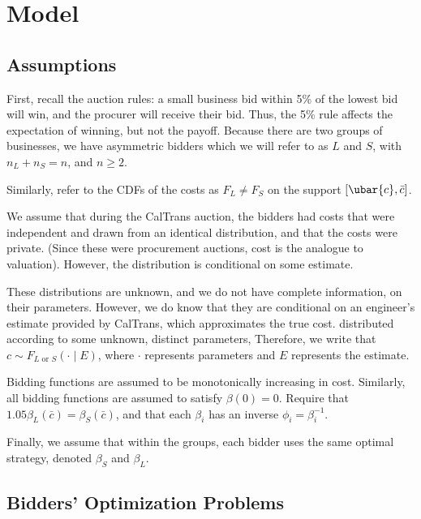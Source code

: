 \section{Model}

\subsection{Assumptions}

First, recall the auction rules: a small business bid
within 5\% of the lowest bid will win, and the procurer will receive their
bid. Thus, the 5\% rule affects the expectation of winning, but not the payoff.
Because there are two groups of businesses, we have asymmetric bidders which
we will refer to as \(L\) and \(S\), with \(n_L + n_S = n\), and \(n \ge 2\).

Similarly, refer to the CDFs of the costs as \(F_{L} \ne F_{S}\)
on the support  \([\ubar{c}, \bar{c}]\).

We assume that during the CalTrans auction, the bidders had costs that
were independent and drawn from an identical distribution, and that the costs
were private. (Since these were procurement auctions, cost is the analogue to
valuation). However, the distribution is conditional on some estimate.

These distributions are unknown, and we do not have complete information, on
their parameters. However, we do know that they are conditional on an engineer's
estimate provided by CalTrans, which approximates the true cost.
distributed according to some unknown, distinct parameters,
Therefore, we write that \(c \sim F_{L \text{ or } S}(\cdot \mid E)\),
where \(\cdot\) represents parameters and \(E\) represents the estimate.
 
Bidding functions are assumed to be monotonically increasing in cost.
Similarly, all bidding functions are assumed to satisfy \(\beta(0) = 0\).
Require that \( 1.05 \beta_L(\bar{c}) = \beta_S(\bar{c})\), and that
each \(\beta_{i}\) has an inverse \(\phi_{i} = \beta_{i}^{-1}\).

Finally, we assume that within the groups, each bidder uses the same optimal
strategy, denoted \(\beta_S\) and \(\beta_L\).

\subsection{Bidders' Optimization Problems}

